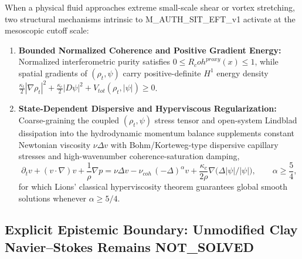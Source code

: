 \documentclass[american,11pt,letterpaper]{article}
\newcommand{\Rcoh}{R_{\mathrm{coh}}}
\def\mathbf#1{#1}%
\def\mathrm#1{#1}%
\def\texttt#1{#1}%
\def\Rcoh{R_coh}%
\begin{document}
When a physical fluid approaches extreme small-scale shear or vortex stretching, two structural mechanisms intrinsic to \texttt{M\_AUTH\_SIT\_EFT\_v1} activate at the mesoscopic cutoff scale:
\begin{enumerate}[leftmargin=2em]
  \item \textbf{Bounded Normalized Coherence and Positive Gradient Energy:} Normalized interferometric purity satisfies $0 \le \Rcoh^{\mathrm{proxy}}(x) \le 1$, while spatial gradients of $(\rho_t, \psi)$ carry positive-definite $H^1$ energy density $\frac{\kappa_t}{2}|\nabla\rho_t|^2 + \frac{\kappa_c}{2}|\mathbf{D}\psi|^2 + V_{\mathrm{tot}}(\rho_t,|\psi|) \ge 0$.
  \item \textbf{State-Dependent Dispersive and Hyperviscous Regularization:} Coarse-graining the coupled $(\rho_t, \psi)$ stress tensor and open-system Lindblad dissipation into the hydrodynamic momentum balance supplements constant Newtonian viscosity $\nu\Delta\mathbf{v}$ with Bohm/Korteweg-type dispersive capillary stresses and high-wavenumber coherence-saturation damping,
  \begin{equation}
  \partial_t\mathbf{v} + (\mathbf{v}\cdot\nabla)\mathbf{v} + \frac{1}{\rho}\nabla p
  = \nu\Delta\mathbf{v} - \nu_{\mathrm{coh}}\,(-\Delta)^\alpha\mathbf{v} + \frac{\kappa_c}{2\rho}\nabla\bigl(\Delta|\psi|/|\psi|\bigr),
  \qquad \alpha \ge \frac{5}{4},
  \label{eq:sit_modified_navier_stokes}
  \end{equation}
  for which Lions' classical hyperviscosity theorem guarantees global smooth solutions whenever $\alpha \ge 5/4$.
\end{enumerate}

\subsection{Explicit Epistemic Boundary: Unmodified Clay Navier--Stokes Remains \texttt{NOT\_SOLVED}}
\end{document}
